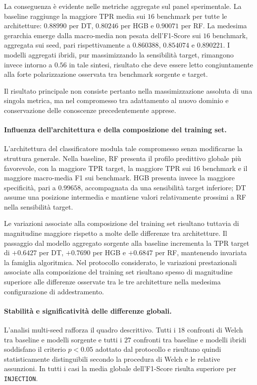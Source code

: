 La conseguenza è evidente nelle metriche aggregate sul panel sperimentale. 
La baseline raggiunge la maggiore TPR media sui $16$ benchmark per tutte le architetture: $0.88990$ per DT, $0.80246$ per HGB e $0.90071$ per RF. 
La medesima gerarchia emerge dalla macro-media non pesata dell'F1-Score sui $16$ benchmark, aggregata sui seed, pari rispettivamente a $0.860388$, $0.854074$ e $0.890221$. 
I modelli aggregati ibridi, pur massimizzando la sensibilità target, rimangono invece intorno a $0.56$ in tale sintesi, risultato che deve essere letto congiuntamente alla forte polarizzazione osservata tra benchmark sorgente e target.

Il risultato principale non consiste pertanto nella massimizzazione assoluta di una singola metrica, ma nel compromesso tra adattamento al nuovo dominio e conservazione delle conoscenze precedentemente apprese.

\paragraph{Influenza dell'architettura e della composizione del training set.}
L'architettura del classificatore modula tale compromesso senza modificarne la struttura generale. 
Nella baseline, RF presenta il profilo predittivo globale più favorevole, con la maggiore TPR target, la maggiore TPR sui $16$ benchmark e il maggiore macro-media F1 sui benchmark. 
HGB presenta invece la maggiore specificità, pari a $0.99658$, accompagnata da una sensibilità target inferiore; DT assume una posizione intermedia e mantiene valori relativamente prossimi a RF nella sensibilità target.

Le variazioni associate alla composizione del training set risultano tuttavia di magnitudine maggiore rispetto a molte delle differenze tra architetture.
Il passaggio dal modello aggregato sorgente alla baseline incrementa la TPR target di $+0.6427$ per DT, $+0.7690$ per HGB e $+0.6847$ per RF, mantenendo invariata la famiglia algoritmica. 
Nel protocollo considerato, le variazioni prestazionali associate alla composizione del training set risultano spesso di magnitudine superiore alle differenze osservate tra le tre architetture nella medesima configurazione di addestramento.

\paragraph{Stabilità e significatività delle differenze globali.}
L'analisi multi-seed rafforza il quadro descrittivo. 
Tutti i $18$ confronti di Welch tra baseline e modelli sorgente e tutti i $27$ confronti tra baseline e modelli ibridi soddisfano il criterio $p<0.05$ adottato dal protocollo e risultano quindi statisticamente distinguibili secondo la procedura di Welch e le relative assunzioni. 
In tutti i casi la media globale dell'F1-Score risulta superiore per \texttt{INJECTION}.


